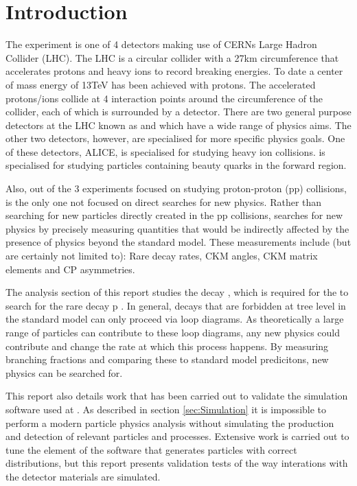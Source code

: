 
\section{Introduction}
\label{sec:Introduction}
The \lhcb experiment is one of 4 detectors making use of CERNs Large Hadron Collider (LHC). The LHC is a circular collider with a 27km circumference that accelerates protons and heavy ions to record breaking energies.  To date a center of mass energy of 13TeV has been achieved with protons.  The accelerated protons/ions collide at 4 interaction points around the circumference of the collider, each of which is surrounded by a detector.  There are two general purpose detectors at the LHC known as \atlas and \cms which have a wide range of physics aims.  The other two detectors, however, are specialised for more specific physics goals.  One of these detectors, ALICE, is specialised for studying heavy ion collisions.  \lhcb is specialised for studying particles containing beauty quarks in the forward region.

Also, out of the 3 experiments focused on studying proton-proton (pp) collisions, \lhcb is the only one not focused on direct searches for new physics.  Rather than searching for new particles directly created in the pp collisions, \lhcb searches for new physics by precisely measuring quantities that would be indirectly affected by the presence of physics beyond the standard model.  These measurements include (but are certainly not limited to): Rare decay rates, CKM angles, CKM matrix elements and CP asymmetries.

The analysis section of this report studies the decay \Bd \to \Kstar \etaz, which is required for the to search for the rare decay \Lb \to p \Km \etaz.  In general, decays that are forbidden at tree level in the standard model can only proceed via loop diagrams.  As theoretically a large range of particles can contribute to these loop diagrams, any new physics could contribute and change the rate at which this process happens.  By measuring branching fractions and comparing these to standard model predicitons, new physics can be searched for.

This report also details work that has been carried out to validate the simulation software used at \lhcb. As described in section \ref{sec:Simulation} it is impossible to perform a modern particle physics analysis without simulating the production and detection of relevant particles and processes.  Extensive work is carried out to tune the element of the software that generates particles with correct distributions, but this report presents validation tests of the way interations with the detector materials are simulated.




